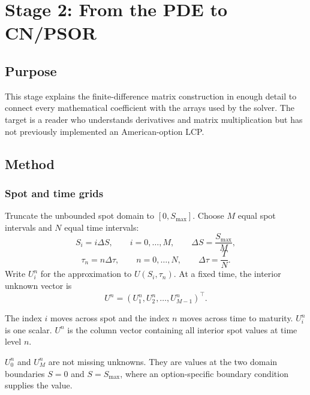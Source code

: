 \section{Stage 2: From the PDE to CN/PSOR}

\subsection{Purpose}
This stage explains the finite-difference matrix construction in enough detail
to connect every mathematical coefficient with the arrays used by the solver.
The target is a reader who understands derivatives and matrix multiplication
but has not previously implemented an American-option LCP.

\subsection{Method}
\subsubsection{Spot and time grids}
Truncate the unbounded spot domain to \([0,S_{\max}]\). Choose \(M\) equal spot
intervals and \(N\) equal time intervals:
\[
  S_i=i\Delta S,
  \qquad
  i=0,\ldots,M,
  \qquad
  \Delta S=\frac{S_{\max}}{M},
\]
\[
  \tau_n=n\Delta\tau,
  \qquad
  n=0,\ldots,N,
  \qquad
  \Delta\tau=\frac{T}{N}.
\]
Write \(U_i^n\) for the approximation to \(U(S_i,\tau_n)\). At a fixed time,
the interior unknown vector is
\[
  U^n=(U_1^n,U_2^n,\ldots,U_{M-1}^n)^\top.
\]

\begin{commonconfusion}
The index \(i\) moves across spot and the index \(n\) moves across time to
maturity. \(U_i^n\) is one scalar. \(U^n\) is the column vector containing all
interior spot values at time level \(n\).
\end{commonconfusion}

\begin{commonconfusion}
\(U_0^n\) and \(U_M^n\) are not missing unknowns. They are values at the two
domain boundaries \(S=0\) and \(S=S_{\max}\), where an option-specific boundary
condition supplies the value.
\end{commonconfusion}


